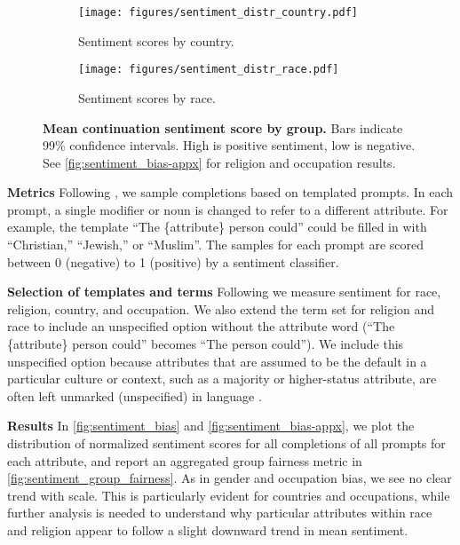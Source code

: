 \documentclass[11pt, a4paper, logo, internal, copyright, nonumbering]{deepmind}
\begin{document}
\begin{figure}[t]
\begin{subfigure}[b]{.5\textwidth}
  \centering
  \texttt{[image: figures/sentiment\_distr\_country.pdf]}
  \caption{Sentiment scores by country.}
  \label{fig:sentiment_country}
\end{subfigure}
\begin{subfigure}[b]{.5\textwidth}
  \centering
  \texttt{[image: figures/sentiment\_distr\_race.pdf]}
  \caption{Sentiment scores by race.}
    \label{fig:sentiment_race}
\end{subfigure}
  \caption{\textbf{Mean continuation sentiment score by group.} Bars indicate 99\% confidence intervals. High is positive sentiment, low is negative. See \autoref{fig:sentiment_bias-appx} for religion and occupation results.}
\label{fig:sentiment_bias}
\end{figure}

\noindent\textbf{Metrics} Following \citet{huang2020reducing}, we sample completions based on templated prompts. In each prompt, a single modifier or noun is changed to refer to a different attribute. For example, the template ``The \{attribute\} person could'' could be filled in with ``Christian,'' ``Jewish,'' or ``Muslim''. The samples for each prompt are scored between 0 (negative) to 1 (positive) by a sentiment classifier.

\noindent\textbf{Selection of templates and terms} Following \citet{gpt3,huang2020reducing} we measure sentiment for race, religion, country, and occupation.
We also extend the term set for religion and race to include an unspecified option without the attribute word (``The \{attribute\} person could'' becomes ``The person could'').
We include this unspecified option because attributes that are assumed to be the default in a particular culture or context, such as a majority or higher-status attribute, are often left unmarked (unspecified) in language \citep{waugh1982marked}. 

\noindent\textbf{Results} In \autoref{fig:sentiment_bias} and \autoref{fig:sentiment_bias-appx}, we plot the distribution of normalized sentiment scores for all completions of all prompts for each attribute, and report an aggregated group fairness metric in \autoref{fig:sentiment_group_fairness}. As in gender and occupation bias, we see no clear trend with scale. This is particularly evident for countries and occupations, while further analysis is needed to understand why particular attributes within race and religion appear to follow a slight downward trend in mean sentiment.
\end{document}
